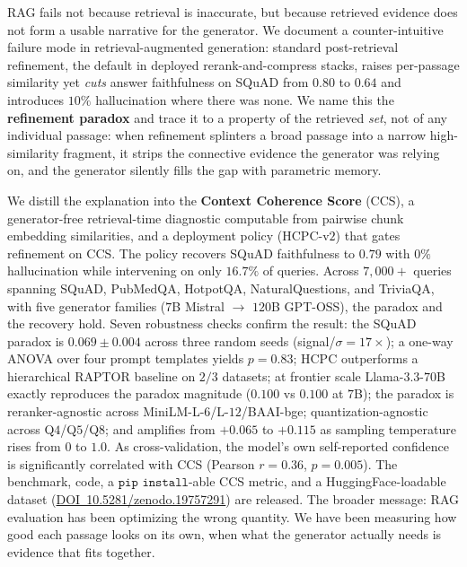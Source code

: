 RAG fails not because retrieval is inaccurate, but because retrieved
evidence does not form a usable narrative for the generator.
We document a counter-intuitive failure mode in retrieval-augmented
generation: standard post-retrieval refinement, the default in deployed
rerank-and-compress stacks, raises per-passage similarity yet
\emph{cuts} answer faithfulness on SQuAD from $0.80$ to $0.64$ and
introduces $10\%$ hallucination where there was none. We name this the
\textbf{refinement paradox} and trace it to a property of the retrieved
\emph{set}, not of any individual passage: when refinement splinters a
broad passage into a narrow high-similarity fragment, it strips the
connective evidence the generator was relying on, and the generator
silently fills the gap with parametric memory.

We distill the explanation into the \textbf{Context Coherence Score}
(CCS), a generator-free retrieval-time diagnostic computable from
pairwise chunk embedding similarities, and a deployment policy
(HCPC-v$2$) that gates refinement on CCS. The policy recovers SQuAD
faithfulness to $0.79$ with $0\%$ hallucination while intervening on
only $16.7\%$ of queries. Across $7{,}000+$ queries spanning SQuAD,
PubMedQA, HotpotQA, NaturalQuestions, and TriviaQA, with five generator
families ($7$B Mistral $\to$ $120$B GPT-OSS), the paradox and the
recovery hold. Seven robustness checks confirm the result: the SQuAD
paradox is $0.069 \pm 0.004$ across three random seeds (signal/$\sigma=
17\times$); a one-way ANOVA over four prompt templates yields $p=0.83$;
HCPC outperforms a hierarchical RAPTOR baseline on $2/3$ datasets; at
frontier scale Llama-$3.3$-$70$B exactly reproduces the paradox
magnitude ($0.100$ vs $0.100$ at $7$B); the paradox is reranker-agnostic
across MiniLM-L-$6$/L-$12$/BAAI-bge; quantization-agnostic across
Q$4$/Q$5$/Q$8$; and amplifies from $+0.065$ to $+0.115$ as sampling
temperature rises from $0$ to $1.0$. As cross-validation, the model's
own self-reported confidence is significantly correlated with CCS
(Pearson $r{=}0.36$, $p{=}0.005$). The benchmark, code, a $\texttt{pip
install}$-able CCS metric, and a HuggingFace-loadable dataset
(\href{https://doi.org/10.5281/zenodo.19757291}{DOI~10.5281/zenodo.19757291})
are released. The broader message: RAG evaluation has been optimizing
the wrong quantity. We have been measuring how good each passage looks
on its own, when what the generator actually needs is evidence that
fits together.
